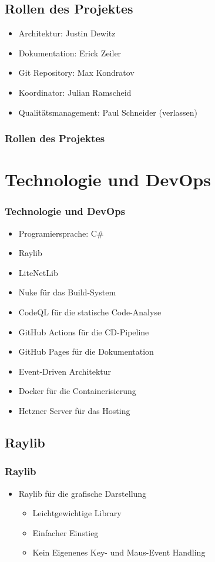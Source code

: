 \documentclass{beamer}
\begin{document}
\subsection{Rollen des Projektes}
\begin{frame}
  \begin{itemize}
    \item Architektur: Justin Dewitz
    \item Dokumentation: Erick Zeiler
    \item Git Repository: Max Kondratov
    \item Koordinator: Julian Ramscheid
    \item Qualitätsmanagement: Paul Schneider (verlassen)
  \end{itemize}
\frametitle{Rollen des Projektes}
\end{frame}

\section{Technologie und DevOps}
\begin{frame}
\frametitle{Technologie und DevOps}
  \begin{itemize}
    \item Programiersprache: C\#
    \item Raylib
    \item LiteNetLib
    \item Nuke für das Build-System
    \item CodeQL für die statische Code-Analyse
    \item GitHub Actions für die CD-Pipeline
    \item GitHub Pages für die Dokumentation
    \item Event-Driven Architektur
    \item Docker für die Containerisierung
    \item Hetzner Server für das Hosting
  \end{itemize}
\end{frame}

\subsection{Raylib}
\begin{frame}
  \frametitle{Raylib}
  \begin{itemize}
    \item Raylib für die grafische Darstellung
    \begin{multicols}{2}
      \begin{itemize}
        \item Leichtgewichtige Library
        \item Einfacher Einstieg
      \end{itemize}
      \columnbreak
      \begin{itemize}
        \item Kein Eigenenes Key- und Maus-Event Handling
      \end{itemize}
    \end{multicols}
    \end{itemize}
\end{frame}
\end{document}
